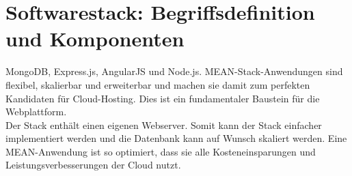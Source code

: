 \label{sec:softwarestack-begriffsdefinition}
\section{Softwarestack: Begriffsdefinition und Komponenten}
MongoDB, Express.js, AngularJS und Node.js. MEAN-Stack-Anwendungen sind flexibel, skalierbar und erweiterbar und machen sie damit zum perfekten Kandidaten für Cloud-Hosting. Dies ist ein fundamentaler Baustein für die Webplattform.\\ 
Der Stack enthält einen eigenen Webserver. Somit kann der Stack einfacher implementiert werden und die Datenbank kann auf Wunsch skaliert werden. Eine MEAN-Anwendung ist so optimiert, dass sie alle Kosteneinsparungen und Leistungsverbesserungen der Cloud nutzt.

